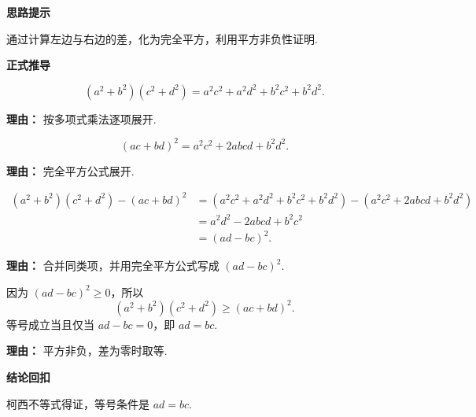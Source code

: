 \begin{proofbox}
	\textbf{\textcolor{CProof}{思路提示}}

	通过计算左边与右边的差，化为完全平方，利用平方非负性证明.

	\medskip
	\textbf{\textcolor{CProof}{正式推导}}
	\begin{description}[style=nextline, leftmargin=2.8em, labelsep=0.5em, itemsep=0.55em]
		\item[\textbf{步骤一（展开左边）：}]
			\[
				(a^{2}+b^{2})(c^{2}+d^{2}) = a^{2}c^{2}+a^{2}d^{2}+b^{2}c^{2}+b^{2}d^{2}.
			\]
			\par\textbf{理由：}
			按多项式乘法逐项展开.

		\item[\textbf{步骤二（展开右边）：}]
			\[
				(ac+bd)^{2} = a^{2}c^{2}+2abcd+b^{2}d^{2}.
			\]
			\par\textbf{理由：}
			完全平方公式展开.

		\item[\textbf{步骤三（作差变形）：}]
			\[
				\begin{aligned}
					(a^{2}+b^{2})(c^{2}+d^{2}) - (ac+bd)^{2}
					&= (a^{2}c^{2}+a^{2}d^{2}+b^{2}c^{2}+b^{2}d^{2}) - (a^{2}c^{2}+2abcd+b^{2}d^{2}) \\
					&= a^{2}d^{2} - 2abcd + b^{2}c^{2} \\
					&= (ad-bc)^{2}.
			\end{aligned}
			\]
			\par\textbf{理由：}
			合并同类项，并用完全平方公式写成 $(ad-bc)^{2}$.

		\item[\textbf{步骤四（判号得证）：}]
			因为 $(ad-bc)^{2} \ge 0$，所以
			\[
				(a^{2}+b^{2})(c^{2}+d^{2}) \ge (ac+bd)^{2}.
			\]
			等号成立当且仅当 $ad-bc=0$，即 $ad=bc$.
			\par\textbf{理由：}
			平方非负，差为零时取等.
	\end{description}

	\medskip
	\textbf{\textcolor{CProof}{结论回扣}}

	柯西不等式得证，等号条件是 $ad=bc$.
\end{proofbox}